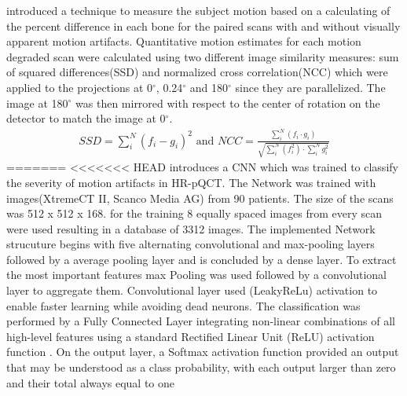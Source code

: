 \documentclass[
a4paper, 
12pt,
grayscalebody, %
abstract=on,
twoside, BCOR10mm, 12pt, DIV13,headinclude, footexclude, final, abstracton, openright
]{ibireprt}
\numberwithin{equation}{chapter}
\numberwithin{table}{chapter}
\numberwithin{figure}{chapter}
\numberwithin{algorithm}{chapter}
\numberwithin{example}{chapter}
\numberwithin{example}{chapter}
\begin{document}
\cite{Sode2011} introduced a technique to measure the subject motion based on a calculating of the percent  difference in each bone for the paired scans with and without visually apparent motion artifacts. Quantitative motion estimates for each motion degraded scan were calculated using two different image similarity measures: sum of squared differences(SSD) and normalized cross correlation(NCC) which were applied to the projections at 0$^{\circ}$, 0.24$^{\circ}$ and 180$^{\circ}$ since they are  parallelized. The image at 180$^{\circ}$ was then mirrored with respect to the center of rotation on the detector to match the image at 0$^{\circ}$. 
\begin{align}
	SSD = \sum_{i}^{N}(f_i-g_i)^2 \textrm{ and }
	 NCC = \frac{\sum_{i}^{N}(f_i \cdot g_i)}{\sqrt{\sum_{i}^{N}(f_i^2) \cdot \sum_{i}^{N}g_i^2}}
\end{align}
=======
<<<<<<< HEAD
\cite{Walle2023} introduces a CNN which was trained to classify the severity of motion artifacts in HR-pQCT. The Network was trained with images(XtremeCT II, Scanco Media AG) from 90 patients. The size of the scans was 512 x 512 x 168. for the training 8 equally spaced images from every scan were used resulting in a database of 3312 images.
The implemented Network strucuture begins with five alternating convolutional and max-pooling layers followed by a average pooling layer and is concluded by a dense layer. To extract the most important features max Pooling was used followed by a convolutional layer to aggregate them. Convolutional layer used (LeakyReLu) activation to enable faster learning while avoiding dead neurons.
 The classification was performed by a Fully Connected Layer integrating non-linear combinations of all high-level features using a standard Rectified Linear Unit (ReLU) activation function . On the output layer, a Softmax activation function provided an output that may be understood as a class probability, with each output larger than zero and their total always equal to one
\end{document}
